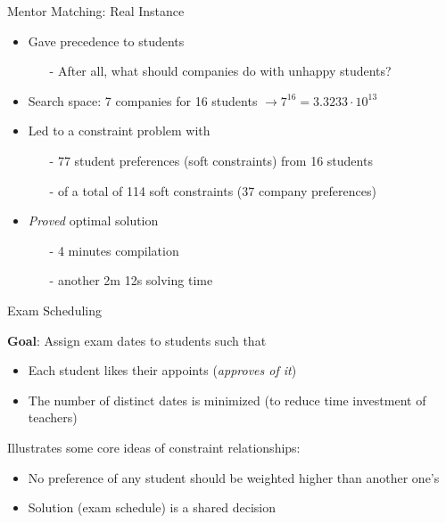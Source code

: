 \documentclass[handout,10pt,xcolor={dvipsnames},fleqn]{beamer}
\begin{document}
\begin{frame}[fragile]{Mentor Matching: Real Instance}
\begin{itemize}
\item Gave precedence to \alert{students}
\begin{itemize}
\item[-] After all, what should companies do with unhappy students?
\end{itemize}
\item Search space: 7 companies for 16 students $\rightarrow 7^{16} = 3.3233 \cdot 10^{13}$
\vspace*{2ex}
\item Led to a constraint problem with 
\begin{itemize}
\item[-] 77 student preferences (soft constraints) from 16 students
\item[-] of a total of 114 soft constraints (37 company preferences) 
\end{itemize}

\vspace*{2ex}

\item \emph{Proved} optimal solution 
\begin{itemize}
\item[-] 4 minutes compilation 
\item[-] another 2m 12s solving time
\end{itemize}
\end{itemize}
\end{frame}


\begin{frame}[fragile]{Exam Scheduling}

\textbf{Goal}: Assign exam dates to students such that 
\begin{itemize}
\item Each student likes their appoints (\emph{approves of it})
\item The number of distinct dates is minimized (to reduce time investment of teachers)
\end{itemize}

\vspace*{2ex}

Illustrates some core ideas of constraint relationships:

\begin{itemize}
\item No preference of any student should be weighted higher than another one's
\item Solution (exam schedule) is a shared decision

\end{itemize}
\end{frame}
\end{document}
